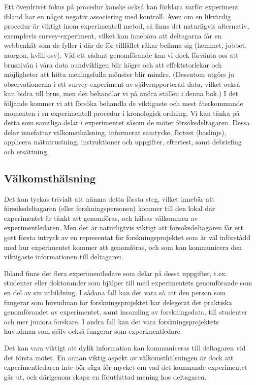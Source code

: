 \documentclass[
]{book}
\begin{document}
Ett överdrivet fokus på procedur kanske också kan förklara varför experiment ibland har en något negativ associering med kontroll. Även om en likvärdig procedur är viktigt inom experimentell metod, så finns det naturligvis alternativ, exemplevis survey-experiment, vilket kan innebära att deltagarna får en webbenkät som de fyller i där de för tillfället råkar befinna sig (hemmet, jobbet, morgon, kväll osv). Vid ett sådant genomförande kan vi dock förvänta oss att brusnivån i våra data oundvikligen blir högre och att effektstorlekar och möjligheter att hitta meningsfulla mönster blir mindre. (Dessutom utgörs ju observationerna i ett survey-experiment av självrapporterad data, vilket också kan bidra till brus, men det behandlar vi på andra ställen i denna bok.) I det följande kommer vi att försöka behandla de viktigaste och mest återkommande momenten i en experimentell procedur i kronologisk ordning. Vi kan tänka på detta som samtliga delar i experimentet såsom de möter försöksdeltagaren. Dessa delar innefattar välkomsthälsning, informerat samtycke, förtest (baslinje), applicera mätutrustning, instruktioner och uppgifter, eftertest, samt debriefing och ersättning.

\hypertarget{sub07.6.1}{%
\subsection{Välkomsthälsning}\label{sub07.6.1}}

Det kan tyckas trivialt att nämna detta första steg, vilket innebär att försöksdeltagaren (eller forskningspersonen) kommer till den lokal där experimentet är tänkt att genomföras, och hälsas välkommen av experimentledaren. Men det är naturligtvis viktigt att försöksdeltagaren får ett gott första intryck av en representat för forskningsprojektet som är väl införstådd med hur experimentet kommer att genomföras, och som kan kommunicera den viktigaste informationen till deltagaren.

Ibland finns det flera experimentledare som delar på dessa uppgifter, t.ex. studenter eller doktorander som hjälper till med experimentets genomförande som en del av sin utbildning. I sådana fall kan det vara så att den person som fungerar som huvudman för forskningsprojektet har delegerat det praktiska genomförandet av experimentet, samt insamling av forskningsdata, till studenter och mer juniora forskare. I andra fall kan det vara forskningsprojektets huvudman som själv också fungerar som experimentledare.

Det kan vara viktigt att dylik information kan kommuniceras till deltagaren vid det första mötet. En annan viktig aspekt av välkomsthälsningen är dock att experimentledaren inte bör säga för mycket om vad det kommande experimentet går ut, och därigenom skapa en förutfattad mening hos deltagaren.
\end{document}
